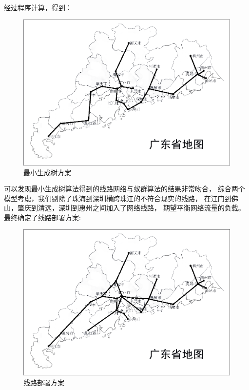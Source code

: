 \documentclass[UTF8,12pt]{ctexart}
\begin{document}
\begin{enumerate}
\begin{itemize}
                    \end{itemize}\par
                经过程序计算，得到：
                    \begin{figure}[H]
                      \centering
                      \includegraphics[scale=0.6]{ZXSCS.png}   %
                      \caption{最小生成树方案}
                      \end{figure} 
            \end{enumerate}

            可以发现最小生成树算法得到的线路网络与蚁群算法的结果非常吻合，
            综合两个模型考虑，我们剔除了珠海到深圳横跨珠江的不符合现实的线路，
            在江门到佛山，肇庆到清远，深圳到惠州之间加入了网络线路，
            期望平衡网络流量的负载。最终确定了线路部署方案:
            \begin{figure}[H]
                \centering
                \includegraphics[scale=0.6]{over.png}   %
                \caption{线路部署方案}
                \end{figure}
\end{document}
